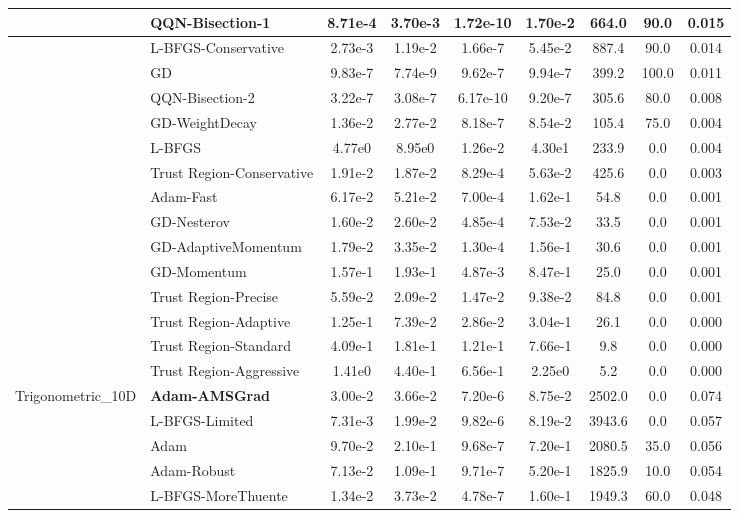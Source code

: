 \documentclass[10pt]{article}
\begin{document}
\begin{longtable}{|l|l|c|c|c|c|c|c|c|}
\hline
 & QQN-Bisection-1 & 8.71e-4 & 3.70e-3 & 1.72e-10 & 1.70e-2 & 664.0 & 90.0 & 0.015 \\
\hline
 & L-BFGS-Conservative & 2.73e-3 & 1.19e-2 & 1.66e-7 & 5.45e-2 & 887.4 & 90.0 & 0.014 \\
\hline
 & GD & 9.83e-7 & 7.74e-9 & 9.62e-7 & 9.94e-7 & 399.2 & 100.0 & 0.011 \\
\hline
 & QQN-Bisection-2 & 3.22e-7 & 3.08e-7 & 6.17e-10 & 9.20e-7 & 305.6 & 80.0 & 0.008 \\
\hline
 & GD-WeightDecay & 1.36e-2 & 2.77e-2 & 8.18e-7 & 8.54e-2 & 105.4 & 75.0 & 0.004 \\
\hline
 & L-BFGS & 4.77e0 & 8.95e0 & 1.26e-2 & 4.30e1 & 233.9 & 0.0 & 0.004 \\
\hline
 & Trust Region-Conservative & 1.91e-2 & 1.87e-2 & 8.29e-4 & 5.63e-2 & 425.6 & 0.0 & 0.003 \\
\hline
 & Adam-Fast & 6.17e-2 & 5.21e-2 & 7.00e-4 & 1.62e-1 & 54.8 & 0.0 & 0.001 \\
\hline
 & GD-Nesterov & 1.60e-2 & 2.60e-2 & 4.85e-4 & 7.53e-2 & 33.5 & 0.0 & 0.001 \\
\hline
 & GD-AdaptiveMomentum & 1.79e-2 & 3.35e-2 & 1.30e-4 & 1.56e-1 & 30.6 & 0.0 & 0.001 \\
\hline
 & GD-Momentum & 1.57e-1 & 1.93e-1 & 4.87e-3 & 8.47e-1 & 25.0 & 0.0 & 0.001 \\
\hline
 & Trust Region-Precise & 5.59e-2 & 2.09e-2 & 1.47e-2 & 9.38e-2 & 84.8 & 0.0 & 0.001 \\
\hline
 & Trust Region-Adaptive & 1.25e-1 & 7.39e-2 & 2.86e-2 & 3.04e-1 & 26.1 & 0.0 & 0.000 \\
\hline
 & Trust Region-Standard & 4.09e-1 & 1.81e-1 & 1.21e-1 & 7.66e-1 & 9.8 & 0.0 & 0.000 \\
\hline
 & Trust Region-Aggressive & 1.41e0 & 4.40e-1 & 6.56e-1 & 2.25e0 & 5.2 & 0.0 & 0.000 \\
Trigonometric\_10D & \textbf{Adam-AMSGrad} & 3.00e-2 & 3.66e-2 & 7.20e-6 & 8.75e-2 & 2502.0 & 0.0 & 0.074 \\
\hline
 & L-BFGS-Limited & 7.31e-3 & 1.99e-2 & 9.82e-6 & 8.19e-2 & 3943.6 & 0.0 & 0.057 \\
\hline
 & Adam & 9.70e-2 & 2.10e-1 & 9.68e-7 & 7.20e-1 & 2080.5 & 35.0 & 0.056 \\
\hline
 & Adam-Robust & 7.13e-2 & 1.09e-1 & 9.71e-7 & 5.20e-1 & 1825.9 & 10.0 & 0.054 \\
\hline
 & L-BFGS-MoreThuente & 1.34e-2 & 3.73e-2 & 4.78e-7 & 1.60e-1 & 1949.3 & 60.0 & 0.048 \\

\end{longtable}
\end{document}
